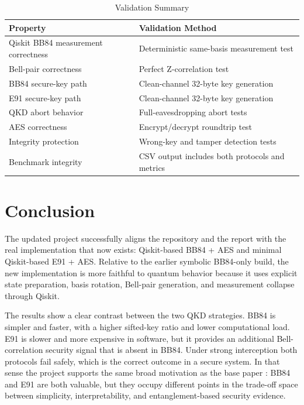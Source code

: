 \documentclass[conference]{IEEEtran}
\begin{document}
\begin{table}[htbp]
\caption{Validation Summary}
\centering
\begin{tabular}{p{}p{}}
\toprule
\textbf{Property} & \textbf{Validation Method} \\
\midrule
Qiskit BB84 measurement correctness & Deterministic same-basis measurement test \\
Bell-pair correctness & Perfect Z-correlation test \\
BB84 secure-key path & Clean-channel 32-byte key generation \\
E91 secure-key path & Clean-channel 32-byte key generation \\
QKD abort behavior & Full-eavesdropping abort tests \\
AES correctness & Encrypt/decrypt roundtrip test \\
Integrity protection & Wrong-key and tamper detection tests \\
Benchmark integrity & CSV output includes both protocols and metrics \\
\bottomrule
\end{tabular}
\label{tab:validation}
\end{table}

\section{Conclusion}
The updated project successfully aligns the repository and the report with the real implementation that now exists: Qiskit-based BB84 + AES and minimal Qiskit-based E91 + AES. Relative to the earlier symbolic BB84-only build, the new implementation is more faithful to quantum behavior because it uses explicit state preparation, basis rotation, Bell-pair generation, and measurement collapse through Qiskit.

The results show a clear contrast between the two QKD strategies. BB84 is simpler and faster, with a higher sifted-key ratio and lower computational load. E91 is slower and more expensive in software, but it provides an additional Bell-correlation security signal that is absent in BB84. Under strong interception both protocols fail safely, which is the correct outcome in a secure system. In that sense the project supports the same broad motivation as the base paper \cite{ain2025novel}: BB84 and E91 are both valuable, but they occupy different points in the trade-off space between simplicity, interpretability, and entanglement-based security evidence.
\end{document}
